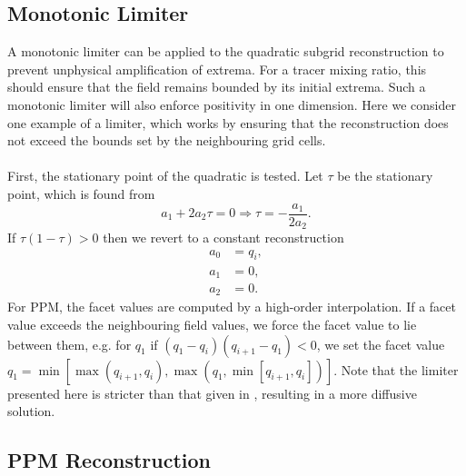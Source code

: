 \documentclass[11pt,a4paper]{article}
\begin{document}
\subsection{Monotonic Limiter} \label{sec:limiter}
A monotonic limiter can be applied to the quadratic subgrid reconstruction to prevent unphysical amplification of extrema.
For a tracer mixing ratio, this should ensure that the field remains bounded by its initial extrema.
Such a monotonic limiter will also enforce positivity in one dimension. 
Here we consider one example of a limiter, which works by ensuring that the reconstruction does not exceed the bounds set by the neighbouring grid cells.  \\
\\
First, the stationary point of the quadratic is tested. Let $\tau$ be the stationary point, which is found from
\begin{equation}
a_1 + 2 a_2 \tau  = 0 \Rightarrow \tau = - \frac{a_1}{2 a_2}. 
\end{equation}
If $\tau(1-\tau) > 0$ then we revert to a constant reconstruction
\begin{subequations}
\begin{align}
    a_0 &= q_i, \\
    a_1 &= 0, \\
    a_2 &= 0.
\end{align}
\end{subequations}
For PPM, the facet values are computed by a high-order interpolation. If a facet value exceeds the neighbouring field values, we force the facet value to lie between them, e.g. for $q_1$ if $(q_1 - q_i)( q_{i+1} - q_1) < 0$, we set the facet value $q_1 = \min[ \max(q_{i+1},q_i), \max(q_1, \min[q_{i+1},q_i]) ]$. Note that the limiter presented here is stricter than that given in \citep{colella1984ppm}, resulting in a more diffusive solution. 

\subsection{PPM Reconstruction} \label{sec:consistent_ppm}
\end{document}
